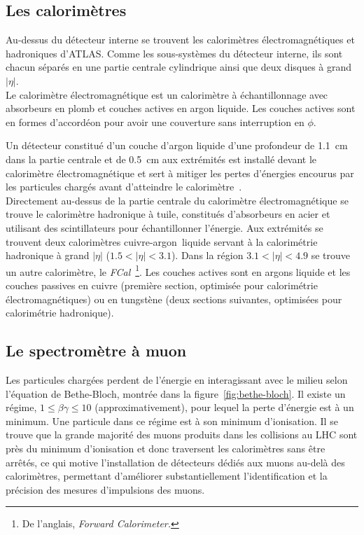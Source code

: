 \subsection{Les calorimètres}
\label{sec:lhc_atlas:atlas:calo}

Au-dessus du détecteur interne se trouvent les calorimètres
électromagnétiques et hadroniques d'ATLAS. Comme les sous-systèmes du
détecteur interne, ils sont chacun séparés en une partie centrale
cylindrique ainsi que deux disques à grand $|\eta|$. \\

Le calorimètre électromagnétique est un calorimètre à échantillonnage
avec absorbeurs en plomb et couches actives en argon liquide. Les
couches actives sont en formes d'accordéon pour avoir une couverture
sans interruption en $\phi$. 

Un détecteur constitué d'un couche
d'argon liquide d'une profondeur de 1.1~cm dans la partie centrale et
de 0.5~cm aux extrémités est installé devant le calorimètre
électromagnétique et sert à mitiger les pertes d'énergies encourus par
les particules chargés avant d'atteindre le
calorimètre~\cite{andrieux_construction_2002}. \\

Directement au-dessus de la partie centrale du calorimètre
électromagnétique se trouve le calorimètre hadronique à tuile,
constitués d'absorbeurs en acier et utilisant des scintillateurs pour
échantillonner l'énergie. Aux extrémités se trouvent deux calorimètres
cuivre-argon~liquide servant à la calorimétrie hadronique à grand
$|\eta|$ ($1.5 < |\eta| < 3.1$). Dans la région $3.1 < |\eta| < 4.9$
se trouve un autre calorimètre, le \emph{FCal}~\footnote{De l'anglais,
  \emph{Forward Calorimeter.}}. Les couches actives sont en argons
liquide et les couches passives en cuivre (première section, optimisée
pour calorimétrie électromagnétiques) ou en tungstène (deux sections
suivantes, optimisées pour calorimétrie hadronique).

\subsection{Le spectromètre à muon}
\label{sec:lhc_atlas:atlas:mu}

Les particules chargées perdent de l'énergie en interagissant avec le
milieu selon l'équation de Bethe-Bloch, montrée dans la figure~\ref{fig:bethe-bloch}. Il
existe un régime, $1 \le\beta\gamma\le 10$ (approximativement), pour
lequel la perte d'énergie est à un minimum. Une particule dans ce
régime est à son minimum d'ionisation. Il se trouve que la grande
majorité des muons produits dans les collisions au LHC sont près du
minimum d'ionisation et donc traversent les calorimètres sans être
arrêtés, ce qui motive l'installation de détecteurs dédiés aux muons
au-delà des calorimètres, permettant d'améliorer substantiellement
l'identification et la précision des mesures d'impulsions des muons.

